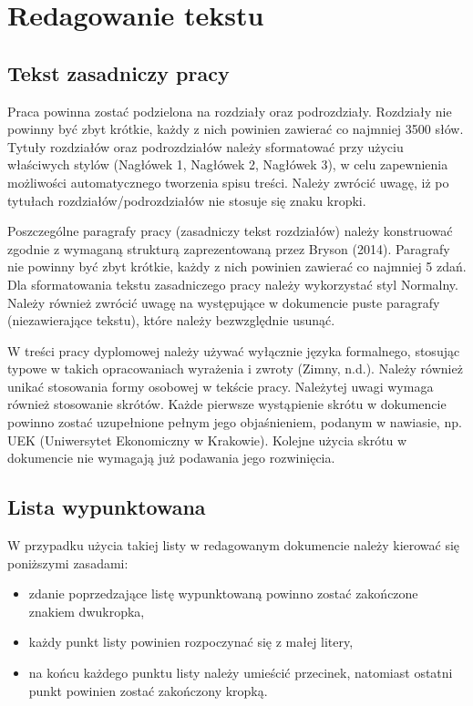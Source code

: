 \chapter{Redagowanie tekstu}
\label{chap:redagowanie_tekstu}



\section{Tekst zasadniczy pracy}

Praca powinna zostać podzielona na rozdziały oraz podrozdziały. Rozdziały nie powinny być zbyt krótkie, każdy z nich powinien zawierać co najmniej 3500 słów. Tytuły rozdziałów oraz podrozdziałów należy sformatować przy użyciu właściwych stylów (Nagłówek 1, Nagłówek 2, Nagłówek 3), w celu zapewnienia możliwości automatycznego tworzenia spisu treści. Należy zwrócić uwagę, iż po tytułach rozdziałów/podrozdziałów nie stosuje się znaku kropki.

Poszczególne paragrafy pracy (zasadniczy tekst rozdziałów) należy konstruować zgodnie z wymaganą strukturą zaprezentowaną przez Bryson (2014). Paragrafy nie powinny być zbyt krótkie, każdy z nich powinien zawierać co najmniej 5 zdań. Dla sformatowania tekstu zasadniczego pracy należy wykorzystać styl Normalny. Należy również zwrócić uwagę na występujące w dokumencie puste paragrafy (niezawierające tekstu), które należy bezwzględnie usunąć.

W treści pracy dyplomowej należy używać wyłącznie języka formalnego, stosując typowe w takich opracowaniach wyrażenia i zwroty (Zimny, n.d.). Należy również unikać stosowania formy osobowej w tekście pracy. Należytej uwagi wymaga również stosowanie skrótów. Każde pierwsze wystąpienie skrótu w dokumencie powinno zostać uzupełnione pełnym jego objaśnieniem, podanym w nawiasie, np. UEK (Uniwersytet Ekonomiczny w Krakowie). Kolejne użycia skrótu w dokumencie nie wymagają już podawania jego rozwinięcia.



\section{Lista wypunktowana}

W przypadku użycia takiej listy w redagowanym dokumencie należy kierować się poniższymi zasadami:

\begin{itemize}
\item zdanie poprzedzające listę wypunktowaną powinno zostać zakończone znakiem dwukropka,
\item każdy punkt listy powinien rozpoczynać się z małej litery,
\item na końcu każdego punktu listy należy umieścić przecinek, natomiast ostatni punkt powinien zostać zakończony kropką.
\end{itemize}

